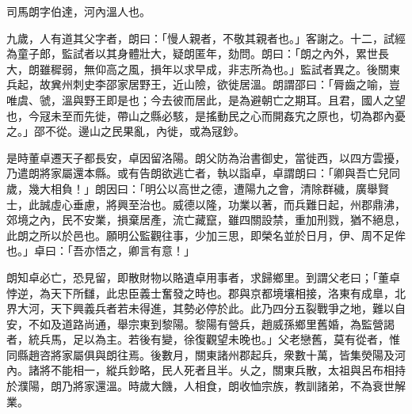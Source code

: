 \begin{pinyinscope}
 
 
 司馬朗字伯達，河內溫人也。
 
 
 九歲，人有道其父字者，朗曰：「慢人親者，不敬其親者也。」客謝之。十二，試經為童子郎，監試者以其身體壯大，疑朗匿年，劾問。朗曰：「朗之內外，累世長大，朗雖穉弱，無仰高之風，損年以求早成，非志所為也。」監試者異之。後關東兵起，故兾州刺史李邵家居野王，近山險，欲徙居溫。朗謂邵曰：「脣齒之喻，豈唯虞、虢，溫與野王即是也；今去彼而居此，是為避朝亡之期耳。且君，國人之望也，今冦未至而先徙，帶山之縣必駭，是搖動民之心而開姦宄之原也，切為郡內憂之。」邵不從。邊山之民果亂，內徙，或為冦鈔。
 
 
是時董卓遷天子都長安，卓因留洛陽。朗父防為治書御史，當徙西，以四方雲擾，乃遣朗將家屬還本縣。或有告朗欲逃亡者，執以詣卓，卓謂朗曰：「卿與吾亡兒同歲，幾大相負！」朗因曰：「明公以高世之德，遭陽九之會，清除群穢，廣舉賢士，此誠虛心垂慮，將興至治也。威德以隆，功業以著，而兵難日起，州郡鼎沸，郊境之內，民不安業，損棄居產，流亡藏竄，雖四關設禁，重加刑戮，猶不絕息，此朗之所以於邑也。願明公監觀往事，少加三思，即榮名並於日月，伊、周不足侔也。」卓曰：「吾亦悟之，卿言有意！」
 
 
 
 
 朗知卓必亡，恐見留，即散財物以賂遺卓用事者，求歸鄉里。到謂父老曰；「董卓悖逆，為天下所讎，此忠臣義士奮發之時也。郡與京都境壤相接，洛東有成臯，北界大河，天下興義兵者若未得進，其勢必停於此。此乃四分五裂戰爭之地，難以自安，不如及道路尚通，舉宗東到黎陽。黎陽有營兵，趙威孫鄉里舊婚，為監營謁者，統兵馬，足以為主。若後有變，徐復觀望未晚也。」父老戀舊，莫有從者，惟同縣趙咨將家屬俱與朗往焉。後數月，關東諸州郡起兵，衆數十萬，皆集熒陽及河內。諸將不能相一，縱兵鈔略，民人死者且半。乆之，關東兵散，太祖與呂布相持於濮陽，朗乃將家還溫。時歲大饑，人相食，朗收恤宗族，教訓諸弟，不為衰世解業。
 

\end{pinyinscope}

